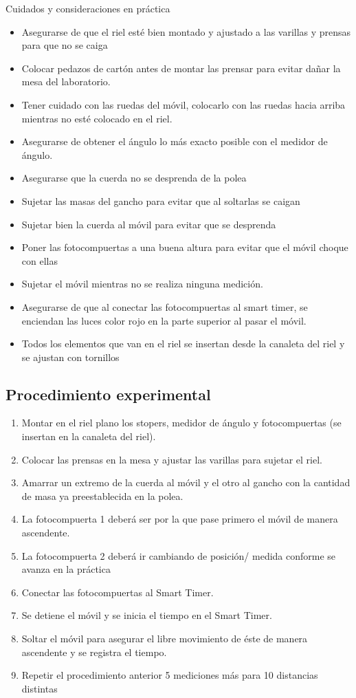 \documentclass{article}
\begin{document}
\begin{multicols}{2}
Cuidados y consideraciones en práctica
\begin{itemize}[label=$*$]
	\item Asegurarse de que el riel esté bien montado y ajustado a las varillas y prensas para
que no se caiga
	\item Colocar pedazos de cartón antes de montar las prensar para evitar dañar la mesa
del laboratorio.
 \item Tener cuidado con las ruedas del móvil, colocarlo con las ruedas hacia arriba
mientras no esté colocado en el riel.
 \item Asegurarse de obtener el ángulo lo más exacto posible con el medidor de ángulo.
 \item Asegurarse que la cuerda no se desprenda de la polea
 \item Sujetar las masas del gancho para evitar que al soltarlas se caigan
 \item Sujetar bien la cuerda al móvil para evitar que se desprenda
 \item Poner las fotocompuertas a una buena altura para evitar que el móvil choque con
ellas
 \item Sujetar el móvil mientras no se realiza ninguna medición.
	\item Asegurarse de que al conectar las fotocompuertas al smart timer, se enciendan las
luces color rojo en la parte superior al pasar el móvil.
\item Todos los elementos que van en el riel se insertan desde la canaleta del riel y se
ajustan con tornillos
\end{itemize}
\subsection{Procedimiento experimental}\label{Procedimiento experimental}
	\begin{enumerate}
		\item Montar en el riel plano los stopers, medidor de ángulo y fotocompuertas (se insertan
en la canaleta del riel).
		\item Colocar las prensas en la mesa y ajustar las varillas para sujetar el riel.
		\item Amarrar un extremo de la cuerda al móvil y el otro al gancho con la cantidad de
masa ya preestablecida en la polea. 
		\item La fotocompuerta 1 deberá ser por la que pase primero el móvil de manera
ascendente.
		\item La fotocompuerta 2 deberá ir cambiando de posición/ medida conforme se avanza
en la práctica 
		\item Conectar las fotocompuertas al Smart Timer.
		\item Se detiene el móvil y se inicia el tiempo en el Smart Timer. 
		\item Soltar el móvil para asegurar el libre movimiento de éste de manera ascendente y se
registra el tiempo.
		\item Repetir el procedimiento anterior 5 mediciones más para 10 distancias distintas 
	\end{enumerate}
\end{multicols}
\end{document}
